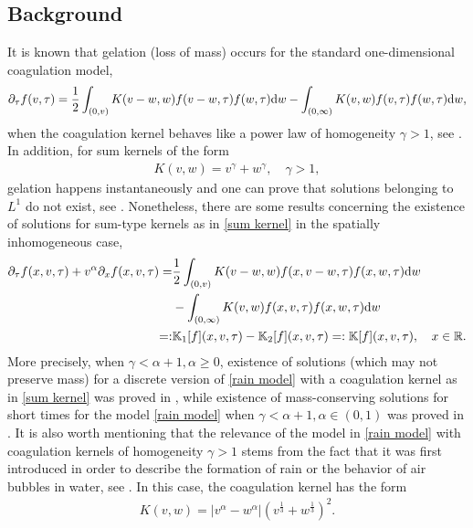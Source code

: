\documentclass[11pt]{article}
\numberwithin{equation}{section}
\newcommand{\der}{\textup{d}}
\begin{document}
\subsection{Background}
It is known that gelation (loss of mass) occurs for the standard one-dimensional coagulation model,
\begin{align*}
    \partial_{\tau}f(v,\tau)=\frac{1}{2}\int_{(0,v)}K(v-w,w)f(v-w,\tau)f(w,\tau)\der w -\int_{(0,\infty)}K(v,w)f(v,\tau)f(w,\tau)\der w,
\end{align*}
when the coagulation kernel behaves like a power law of homogeneity $\gamma>1$, see \cite{gelationpaper,papergelationlaurencot, esclaumischperth, gelfournier2025}. In addition, for sum kernels of the form
\begin{align}\label{sum kernel}
    K(v,w)=v^{\gamma}+w^{\gamma}, \quad \gamma>1,
\end{align}
gelation happens instantaneously and one can prove that solutions belonging to $L^{1}$ do not exist, see \cite{ballcarr,bookcoagulation,Carr1992,Dongen}. Nonetheless, there are some results concerning the existence of solutions for sum-type kernels as in \eqref{sum kernel} in the spatially inhomogeneous case,
\begin{align}\label{rain model}
    \partial_{\tau}f(x,v,\tau)+v^{\alpha}\partial_{x}f(x,v,\tau)=&\frac{1}{2}\int_{(0,v)}K(v-w,w)f(x,v-w,\tau)f(x,w,\tau)\der w \nonumber\\
    &-\int_{(0,\infty)}K(v,w)f(x,v,\tau)f(x,w,\tau)\der w\\
    =:&\mathbb{K}_{1}[f](x,v,\tau)-\mathbb{K}_{2}[f](x,v,\tau) =:\mathbb{K}[f](x,v,\tau), \quad x\in\mathbb{R}.\nonumber
\end{align}
More precisely, when $\gamma<\alpha+1, \alpha\geq 0$, existence of solutions (which may not preserve mass) for a discrete version of \eqref{rain model} with a coagulation kernel as in \eqref{sum kernel} was proved in \cite{galkin}, while existence of mass-conserving solutions for short times for the model \eqref{rain model} when $\gamma<\alpha+1, \alpha\in(0,1)$ was proved in \cite{cristianinhom}. It is also worth mentioning that the relevance of the model in \eqref{rain model} with coagulation kernels of homogeneity $\gamma>1$ stems from the fact that it was first introduced in order to describe the formation of rain or the behavior of air bubbles in water, see \cite{physicspaper, precipitation, raininitiation, tanaka}. In this case, the coagulation kernel has the form
\begin{align}\label{rain kernel intro}
    K(v,w)=|v^{\alpha}-w^{\alpha}|(v^{\frac{1}{3}}+w^{\frac{1}{3}})^{2}.
\end{align}
\end{document}
